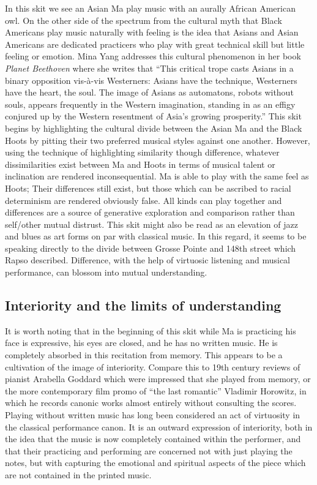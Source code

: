 \documentclass[12pt,letterpaper]{article}
\begin{document}
	In this skit we see an Asian Ma play music with an aurally 
	African American owl. On the other side of the spectrum from the 
	cultural myth that Black Americans play music naturally with feeling is
	the idea that Asians and Asian Americans are dedicated practicers who 
	play with great technical skill but little feeling or emotion. Mina Yang
	addresses this cultural phenomenon in her book \textit{Planet Beethoven}
	where she writes that ``This critical trope casts Asians in a binary 
	opposition vis-à-vis Westerners: Asians have the technique, Westerners 
	have the heart, the soul. The image of Asians as automatons, robots 
	without souls, appears frequently in the Western imagination, standing 
	in as an effigy conjured up by the Western resentment of Asia’s growing
	prosperity.''\autocite[79]{Yang} This skit begins by highlighting the 
	cultural divide between the Asian Ma and the Black Hoots by pitting 
	their two preferred musical styles against one another. However, using 
	the technique of highlighting similarity though difference, whatever 
	dissimilarities exist between Ma and Hoots in terms of musical talent or
	inclination are rendered inconsequential. Ma is able to play with the 
	same feel as Hoots; Their differences still exist, but those which can 
	be ascribed to racial determinism are rendered obviously false. All 
	kinds can play together and differences are a source of generative 
	exploration and comparison rather than self/other mutual distrust. This
	skit might also be read as an elevation of jazz and blues as art forms 
	on par with classical music. In this regard, it seems to be speaking 
	directly to the divide between Grosse Pointe and 148th street which 
	Rapso described. Difference, with the help of virtuosic listening and 
	musical performance, can blossom into mutual understanding.


	\subsection*{Interiority and the limits of understanding}

	It is worth noting that in the beginning of this skit while Ma is 
	practicing his face is expressive, his eyes are closed, and he has no 
	written music. He is completely absorbed in this recitation from memory.
	This appears to be a cultivation of the image of interiority. Compare
	this to 19th century reviews of pianist Arabella Goddard which were 
	impressed that she played from memory,\autocite{Goddard} or the more 
	contemporary film promo of ``the last romantic'' Vladimir Horowitz, in 
	which he records canonic works almost entirely without consulting the 
	scores. Playing without written music has long been considered an act of
	virtuosity in the classical performance canon. It is an outward 
	expression of interiority, both in the idea that the music is now 
	completely contained within the performer, and that their practicing and
	performing are concerned not with just playing the notes, but 
	with capturing the emotional and spiritual aspects of the piece which 
	are not contained in the printed music. 
\end{document}
